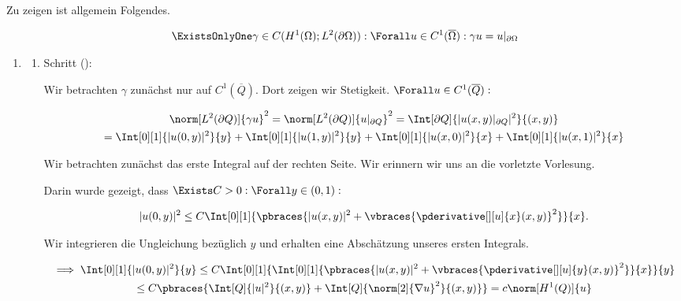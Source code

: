 \begin{solution}

Zu zeigen ist allgemein Folgendes.

\begin{align*}
  \ExistsOnlyOne \gamma \in C
  (
    H^1(\Omega);
    L^2(\partial \Omega)
  ):
  \Forall u \in C^1(\overline{\Omega}):
  \gamma u = u|_{\partial \Omega}
\end{align*}

\begin{enumerate}[label = \textbf{\alph*)}]

  \item

  \begin{enumerate}[label = \arabic*.]

    \item Schritt ():

    Wir betrachten $\gamma$ zunächst nur auf $C^1(\overline{Q})$.
    Dort zeigen wir Stetigkeit.
    $\Forall u \in C^1(\overline{Q}):$

    \begin{multline*}
      \norm[L^2(\partial Q)]{\gamma u}^2
      =
      \norm[L^2(\partial Q)]{u|_{\partial Q}}^2
      =
      \Int[\partial Q]{|u(x, y)|_{\partial Q}|^2}{(x, y)} \\
      =
      \Int[0][1]{|u(0, y)|^2}{y}
      +
      \Int[0][1]{|u(1, y)|^2}{y}
      +
      \Int[0][1]{|u(x, 0)|^2}{x}
      +
      \Int[0][1]{|u(x, 1)|^2}{x}
    \end{multline*}

    Wir betrachten zunächst das erste Integral auf der rechten Seite.
    Wir erinnern wir uns an die vorletzte Vorlesung.


    Darin wurde gezeigt, dass $\Exists C > 0: \Forall y \in (0, 1):$

    \begin{align*}
      |u(0, y)|^2
      \leq
      C\Int[0][1]
      {
        \pbraces
        {
          |u(x, y)|^2
          +
          \vbraces
          {
            \pderivative[][u]{x}(x, y)
          }^2
        }
      }{x}.
    \end{align*}

    Wir integrieren die Ungleichung bezüglich $y$ und erhalten eine Abschätzung unseres ersten Integrals.

    \begin{multline*}
      \implies
      \Int[0][1]{|u(0, y)|^2}{y}
      \leq
      C
      \Int[0][1]
      {
        \Int[0][1]
        {
          \pbraces
          {
            |u(x, y)|^2
            +
            \vbraces
            {
              \pderivative[][u]{y}(x, y)
            }^2
          }
        }{x}
      }{y} \\
      \leq
      C
      \pbraces
      {
        \Int[Q]{|u|^2}{(x, y)}
        +
        \Int[Q]{\norm[2]{\nabla u}^2}{(x, y)}
      }
      =
      c \norm[H^1(Q)]{u}
    \end{multline*}


\end{enumerate}
\end{enumerate}
\end{solution}
